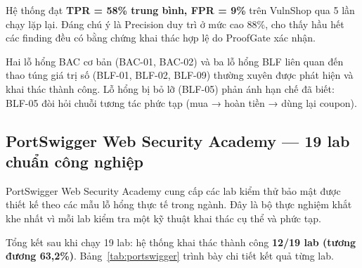 Hệ thống đạt \textbf{TPR = 58\% trung bình, FPR = 9\%} trên VulnShop qua 5 lần chạy lặp lại. Đáng chú ý là Precision duy trì ở mức cao 88\%, cho thấy hầu hết các finding đều có bằng chứng khai thác hợp lệ do ProofGate xác nhận.

Hai lỗ hổng BAC cơ bản (BAC-01, BAC-02) và ba lỗ hổng BLF liên quan đến thao túng giá trị số (BLF-01, BLF-02, BLF-09) thường xuyên được phát hiện và khai thác thành công. Lỗ hổng bị bỏ lỡ (BLF-05) phản ánh hạn chế đã biết: BLF-05 đòi hỏi chuỗi tương tác phức tạp (mua → hoàn tiền → dùng lại coupon).

\subsection{PortSwigger Web Security Academy --- 19 lab chuẩn công nghiệp}

PortSwigger Web Security Academy cung cấp các lab kiểm thử bảo mật được thiết kế theo các mẫu lỗ hổng thực tế trong ngành. Đây là bộ thực nghiệm khắt khe nhất vì mỗi lab kiểm tra một kỹ thuật khai thác cụ thể và phức tạp.

Tổng kết sau khi chạy 19 lab: hệ thống khai thác thành công \textbf{12/19 lab (tương đương 63,2\%)}. Bảng~\ref{tab:portswigger} trình bày chi tiết kết quả từng lab.

